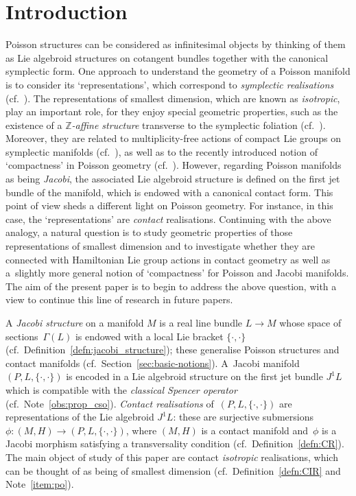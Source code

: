 \documentclass[pdftex]{sigma}
\numberwithin{equation}{section}
\newcommand{\JM}{(P,L,\{\cdot,\cdot\})} %
\newcommand{\CM}{(M,H)} %
\newcommand{\ZZ}{\mathbb{Z}}
\begin{document}


{\small \tableofcontents}

\renewcommand{\thefootnote}{\arabic{footnote}}
\setcounter{footnote}{0}

\section{Introduction}\label{sec:introduction}
Poisson structures can be considered as inf\/initesimal objects by thinking of them as Lie algebroid structures on cotangent bundles together with the canonical symplectic form. One approach to understand the geometry of a Poisson manifold is to consider its `representations', which correspond to {\it symplectic realisations} (cf.~\cite{CrainicFernandes:jdd,Weinstein}). The representations of smallest dimension, which are known as {\it isotropic}, play an important role, for they enjoy special geometric properties, such as the existence of a {\it $\ZZ$-affine structure} transverse to the symplectic foliation (cf.~\cite{PMCT2, dd}). Moreover, they are related to multiplicity-free actions of compact Lie groups on symplectic manifolds (cf.~\cite{dd,gui_sja}), as well as to the recently introduced notion of `compactness' in Poisson geometry (cf.\ \cite{PMCT1,PMCT2}). However, regarding Poisson manifolds as being {\it Jacobi}, the associated Lie algebroid structure is def\/ined on the f\/irst jet bundle of the manifold, which is endowed with a canonical contact form. This point of view sheds a dif\/ferent light on Poisson geometry. For instance, in this case, the `representations' are {\it contact} realisations. Continuing with the above analogy, a natural question is to study geometric properties of those representations of smallest dimension and to investigate whether they are connected with Hamiltonian Lie group actions in contact geometry as well as a~slightly more general notion of `compactness' for Poisson and Jacobi manifolds. The aim of the present paper is to begin to address the above question, with a view to continue this line of research in future papers.

A {\it Jacobi structure} on a manifold $M$ is a real line bundle $L \to M$ whose space of sec\-tions~$\Gamma(L)$ is endowed with a local Lie bracket $\{\cdot, \cdot\}$ (cf.\ Def\/inition~\ref{defn:jacobi_structure}); these generalise Poisson structures and contact manifolds (cf.\ Section~\ref{sec:basic-notions}). A~Jacobi manifold $\JM$ is encoded in a Lie algebroid structure on the f\/irst jet bundle $J^1L$ which is compatible with the {\it classical Spencer operator} (cf.\ Note~\ref{obs:prop_cso}). {\it Contact realisations} of~$\JM$ are representations of the Lie algebroid $J^1L$: these are surjective submersions $\phi \colon \CM \to \JM$, where $\CM$ is a contact manifold and~$\phi$ is a Jacobi morphism satisfying a transversality condition (cf.\ Def\/inition~\ref{defn:CR}). The main object of study of this paper are contact {\it isotropic} realisations, which can be thought of as being of smallest dimension (cf.\ Def\/inition~\ref{defn:CIR} and Note~\ref{item:po}).
\end{document}
